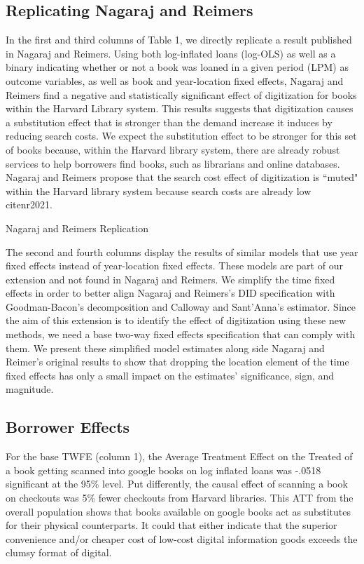 \documentclass{article}
\begin{document}
\subsection{Replicating Nagaraj and Reimers}

In the first and third columns of Table 1, we directly replicate a result published in Nagaraj and Reimers. Using both log-inflated loans (log-OLS) as well as a binary indicating whether or not a book was loaned in a given period (LPM) as outcome variables, as well as book and year-location fixed effects, Nagaraj and Reimers find a negative and statistically significant effect of digitization for books within the Harvard Library system. This results suggests that digitization causes a substitution effect that is stronger than the demand increase it induces by reducing search costs. We expect the substitution effect to be stronger for this set of books because, within the Harvard library system, there are already robust services to help borrowers find books, such as librarians and online databases. Nagaraj and Reimers propose that the search cost effect of digitization is ``muted" within the Harvard library system because search costs are already low cite{nr2021}. 

\begin{table}[htbp]
   \centering
   \caption{Nagaraj and Reimers Replication}
  
   \label{tab:booktabs}
\end{table}

The second and fourth columns display the results of similar models that use year fixed effects instead of year-location fixed effects. These models are part of our extension and not found in Nagaraj and Reimers. We simplify the time fixed effects in order to better align Nagaraj and Reimers's DID specification with Goodman-Bacon's decomposition and Calloway and Sant'Anna's estimator. Since the aim of this extension is to identify the effect of digitization using these new methods, we need a base two-way fixed effects specification that can comply with them. We present these simplified model estimates along side Nagaraj and Reimer's original results to show that dropping the location element of the time fixed effects has only a small impact on the estimates' significance, sign, and magnitude.

\subsection{Borrower Effects}
For the base TWFE (column 1), the Average Treatment Effect on the Treated of a book getting scanned into google books on log inflated loans was -.0518 significant at the 95\% level. Put differently, the causal effect of scanning a book on checkouts was 5\% fewer checkouts from Harvard libraries. This ATT from the overall population shows that books available on google books act as substitutes for their physical counterparts. It could that either indicate that the superior convenience and/or cheaper cost of low-cost digital information goods exceeds the clumsy format of digital. 
\end{document}
